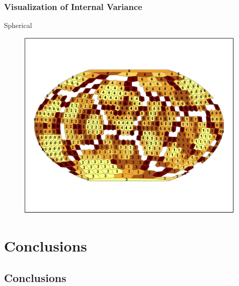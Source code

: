 \documentclass[nototal,handout]{beamer}
\begin{document}
\begin{frame}
	\frametitle{Visualization of Internal Variance}
 
\begin{block}{Spherical}
  \begin{center}
  \begin{figure}
  \includegraphics[width=0.70\linewidth]{sphere_clusters.png}
  \end{figure}
  \end{center}
 \end{block} \end{frame} 


\section{Conclusions} 

\subsection{Conclusions} 
\end{document}
